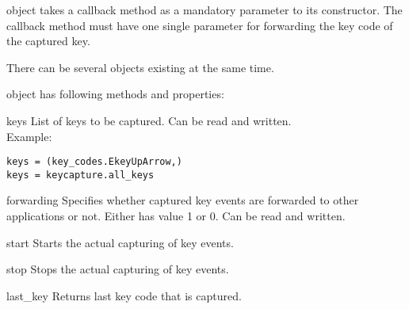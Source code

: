  object takes a callback method as a mandatory parameter to 
its constructor. The callback method must have one single parameter for 
forwarding the key code of the captured key.

There can be several  objects existing at the same time.

 object has following methods and properties:

\begin{memberdesc}[KeyCapturer]{keys}
List of keys to be captured. Can be read and written.
\\Example:
\begin{verbatim}
keys = (key_codes.EkeyUpArrow,)
keys = keycapture.all_keys
\end{verbatim} 
\end{memberdesc}

\begin{memberdesc}[KeyCapturer]{forwarding}
Specifies whether captured key events are forwarded to other applications or not.
Either has value 1 or 0. Can be read and written.
\end{memberdesc}

\begin{methoddesc}[KeyCapturer]{start}{}
Starts the actual capturing of key events.
\end{methoddesc}

\begin{methoddesc}[KeyCapturer]{stop}{}
Stops the actual capturing of key events.
\end{methoddesc}

\begin{methoddesc}[KeyCapturer]{last_key}{}
Returns last key code that is captured. 
\end{methoddesc}

